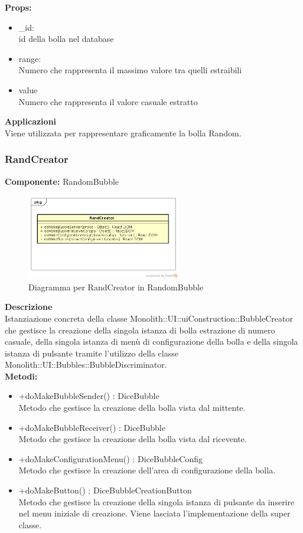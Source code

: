 \textbf{Props:} 
\begin{itemize}
\item \_id: 
\\
id della bolla nel database
\item range: 
\\
Numero che rappresenta il massimo valore tra quelli estraibili
\item value
\\
Numero che rappresenta il valore casuale estratto

\end{itemize} 


\textbf{Applicazioni}\\
Viene utilizzata per rappresentare graficamente la bolla Random. 


\clearpage

\subsubsection{RandCreator}
\textbf{Componente:}  RandomBubble\\
   \FloatBarrier
   \begin{figure}[ht]
   \centering
   \includegraphics[width=0.6\textwidth]{img/single-RandCreator.png}
   \caption{{Diagramma per RandCreator in RandomBubble}}
\end{figure}
\FloatBarrier
\textbf{Descrizione}\\
Istanziazione concreta della classe Monolith::UI::uiConstruction::BubbleCreator che gestisce la creazione della singola istanza di bolla estrazione di numero casuale, della singola istanza di menù di configurazione della bolla e della singola istanza di pulsante tramite l'utilizzo della classe Monolith::UI::Bubbles::BubbleDiscriminator.
\\
\textbf{Metodi:} 
\begin{itemize}
\item +doMakeBubbleSender() : DiceBubble 
\\
Metodo che gestisce la creazione della bolla vista dal mittente.
\item +doMakeBubbleReceiver() : DiceBubble 
\\
Metodo che gestisce la creazione della bolla vista dal ricevente.
\item +doMakeConfigurationMenu() : DiceBubbleConfig 
\\
Metodo che gestisce la creazione dell'area di configurazione della bolla.
\item +doMakeButton() : DiceBubbleCreationButton 
\\
Metodo che gestisce la creazione della singola istanza di pulsante da inserire nel menu iniziale di creazione. Viene lasciata l'implementazione della super classe.
\end{itemize} 


